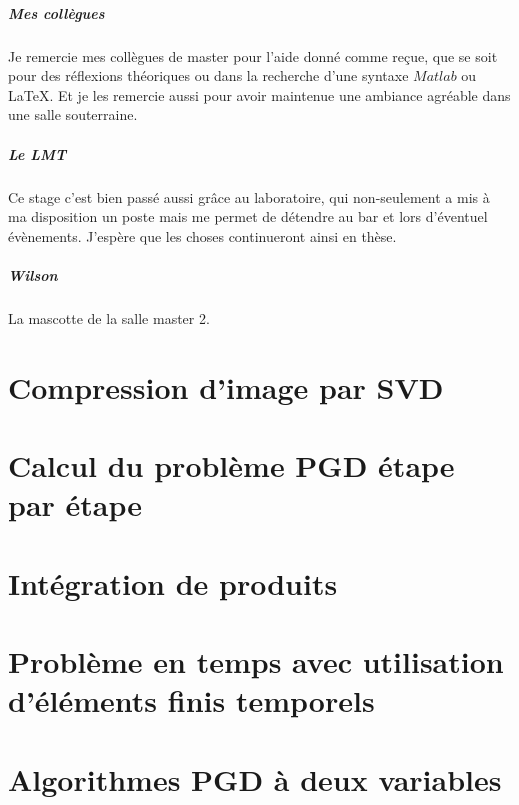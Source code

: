\documentclass[12pt,a4paper]{report}
\begin{document}
\paragraph{Mes collègues}
Je remercie mes collègues de master pour l'aide donné comme reçue, que se soit pour des réflexions théoriques ou dans la recherche d'une syntaxe $Matlab$ ou \LaTeX. Et je les remercie aussi pour avoir maintenue une ambiance agréable dans une salle souterraine.

\paragraph{Le LMT}
Ce stage c'est bien passé aussi grâce au laboratoire, qui non-seulement a mis à ma disposition un poste mais me permet de détendre au bar et lors d'éventuel évènements. J'espère que les choses continueront ainsi en thèse.

\paragraph{Wilson} La mascotte de la salle master 2.


\chapter{Compression d'image par SVD}


\chapter{Calcul du problème PGD étape par étape}


\chapter{Intégration de produits}
\label{IntegrDeProd}


\chapter{Problème en temps avec utilisation d'éléments finis temporels}


\chapter{Algorithmes PGD à deux variables}
\label{AlgorithmesPGD}

\end{document}
